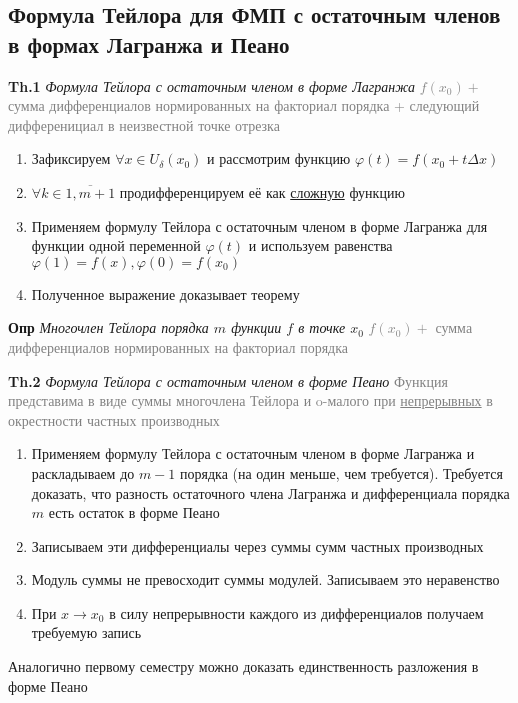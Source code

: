 \subsection{Формула Тейлора для ФМП с остаточным членов в формах Лагранжа и Пеано}

\textbf{Th.1} \textit{Формула Тейлора с остаточным членом в форме Лагранжа}
\textcolor{gray}{$f(x_0) +$ сумма дифференциалов нормированных на факториал порядка +
следующий дифференициал в неизвестной точке отрезка}

\begin{enumerate}
    \item Зафиксируем $\forall x \in U_{\delta}(x_0)$ и рассмотрим функцию $\varphi(t) = f(x_0 + t\Delta x)$
    \item $\forall k \in \overline{1, m+1}$ продифференцируем её как \underline{сложную} функцию
    \item Применяем формулу Тейлора с остаточным членом в форме Лагранжа для функции одной переменной $\varphi(t)$
    и используем равенства $\varphi (1) = f(x), \varphi (0) = f(x_0)$
    \item Полученное выражение доказывает теорему
\end{enumerate}

\textbf{Опр} \textit{Многочлен Тейлора порядка $m$ функции $f$ в точке $x_0$}
\textcolor{gray}{$f(x_0) +$ сумма дифференциалов нормированных на факториал порядка}

\textbf{Th.2} \textit{Формула Тейлора с остаточным членом в форме Пеано}
\textcolor{gray}{Функция представима в виде суммы многочлена Тейлора и o-малого при \underline{непрерывных} в
окрестности частных производных}

\begin{enumerate}
    \item Применяем формулу Тейлора с остаточным членом в форме Лагранжа и раскладываем до $m-1$ порядка
    (на один меньше, чем требуется).
    Требуется доказать, что разность остаточного члена Лагранжа и дифференциала порядка $m$ есть остаток в форме Пеано
    \item Записываем эти дифференциалы через суммы сумм частных производных
    \item Модуль суммы не превосходит суммы модулей.
    Записываем это неравенство
    \item При $x \rightarrow x_0 $ в силу непрерывности каждого из дифференциалов получаем требуемую запись
\end{enumerate}

Аналогично первому семестру можно доказать единственность разложения в форме Пеано